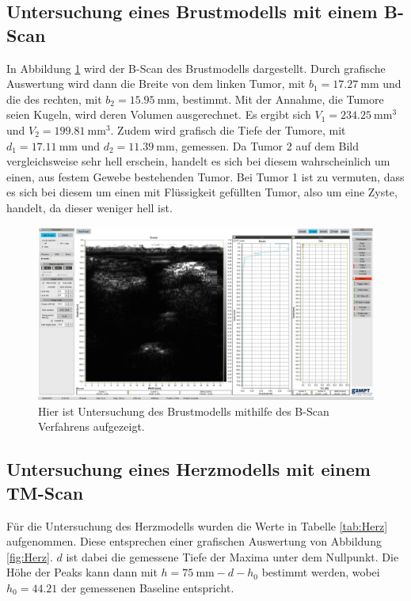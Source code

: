\subsection{Untersuchung eines Brustmodells mit einem B-Scan}

In Abbildung \ref{fig:Brust} wird der B-Scan des Brustmodells dargestellt.
Durch grafische Auswertung wird dann die Breite von dem linken Tumor, mit $b_1=\qty{17.27}{\milli\meter}$ und die des rechten, mit $b_2=\qty{15.95}{\milli\meter}$, bestimmt.
Mit der Annahme, die Tumore seien Kugeln, wird deren Volumen ausgerechnet.
Es ergibt sich $V_1=\qty{234.25}{\milli\meter\cubed}$ und $V_2=\qty{199.81}{\milli\meter\cubed}$.
Zudem wird grafisch die Tiefe der Tumore, mit $d_1=\qty{17.11}{\milli\meter}$ und $d_2=\qty{11.39}{\milli\meter}$, gemessen.
Da Tumor 2 auf dem Bild vergleichsweise sehr hell erschein, handelt es sich bei diesem wahrscheinlich um einen, aus festem Gewebe bestehenden Tumor.
Bei Tumor 1 ist zu vermuten, dass es sich bei diesem um einen mit Flüssigkeit gefüllten Tumor, also um eine Zyste, handelt, da dieser weniger hell ist. 

\begin{figure}
  \centering
  \includegraphics[width=\textwidth]{Bilder/Brust6.jpg}
  \caption{Hier ist Untersuchung des Brustmodells mithilfe des B-Scan Verfahrens aufgezeigt.}
  \label{fig:Brust}
\end{figure}

\subsection{Untersuchung eines Herzmodells mit einem TM-Scan}

Für die Untersuchung des Herzmodells wurden die Werte in Tabelle \ref{tab:Herz} aufgenommen.
Diese entsprechen einer grafischen Auswertung von Abbildung \ref{fig:Herz}.
$d$ ist dabei die gemessene Tiefe der Maxima unter dem Nullpunkt. 
Die Höhe der Peaks kann dann mit $h=\qty{75}{\milli\meter}-d-h_0$ bestimmt werden, wobei $h_0=44.21$ der gemessenen Baseline entspricht.

